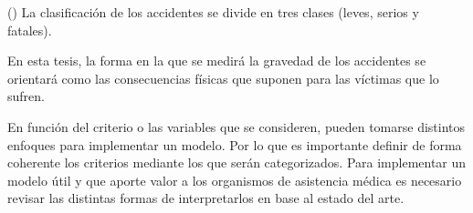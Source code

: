 \documentclass{uathesis-es}
\begin{document}
(\cite{su14031729}) La clasificación de los accidentes se divide en tres clases (leves, serios y fatales).
 

En esta tesis, la forma en la que se medirá la gravedad de los accidentes se orientará como las consecuencias físicas que suponen para las víctimas que lo sufren. 


En función del criterio o las variables que se consideren, pueden tomarse distintos enfoques para implementar un modelo. Por lo que es importante definir de forma coherente los criterios mediante los que serán categorizados. Para implementar un modelo útil y que aporte valor a los organismos de asistencia médica es necesario revisar las distintas formas de interpretarlos en base al estado del arte.


\end{document}
